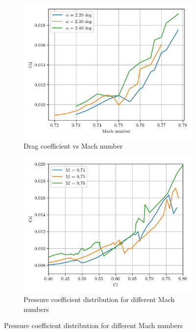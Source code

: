 \documentclass{article}
\begin{document}
\begin{figure}
    \centering
    \begin{subfigure}[t]{0.45\textwidth}
        \centering
        \includegraphics[width=\textwidth]{figures/cd_vs_mach.png}
        \caption{Drag coefficient vs Mach number}
        \label{fig:cd_vs_mach}
    \end{subfigure}
    \begin{subfigure}[t]{0.45\textwidth}
        \centering
        \includegraphics[width=\textwidth]{figures/cd_vs_cl.png}
        \caption{Pressure coefficient distribution for different Mach numbers}
        \label{fig:cd_vs_cl}
    \end{subfigure}
\end{figure}
\end{document}
